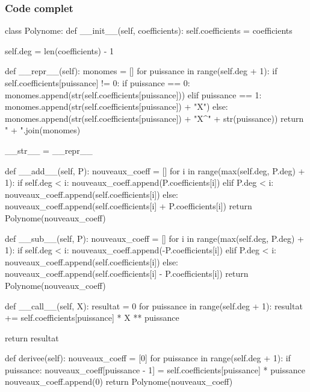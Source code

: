 		\subsubsection{Code complet}
		\begin{pythoncode}
			class Polynome:
				def __init__(self, coefficients):
					self.coefficients = coefficients

					self.deg = len(coefficients) - 1

				def __repr__(self):
					monomes = []
					for puissance in range(self.deg + 1):
						if self.coefficients[puissance] != 0:
						    if puissance == 0:
						        monomes.append(str(self.coefficients[puissance]))
						    elif puissance == 1:
						        monomes.append(str(self.coefficients[puissance]) + "X")
						    else:
						        monomes.append(str(self.coefficients[puissance]) + "X^" + str(puissance))
					return " + ".join(monomes)

				__str__ = __repr__

				def __add__(self, P):
					nouveaux_coeff = []
					for i in range(max(self.deg, P.deg) + 1):
						if self.deg < i:
						    nouveaux_coeff.append(P.coefficients[i])
						elif P.deg < i:
						    nouveaux_coeff.append(self.coefficients[i])
						else:
						    nouveaux_coeff.append(self.coefficients[i] + P.coefficients[i])
					return Polynome(nouveaux_coeff)

				def __sub__(self, P):
					nouveaux_coeff = []
					for i in range(max(self.deg, P.deg) + 1):
						if self.deg < i:
						    nouveaux_coeff.append(-P.coefficients[i])
						elif P.deg < i:
						    nouveaux_coeff.append(self.coefficients[i])
						else:
						    nouveaux_coeff.append(self.coefficients[i] - P.coefficients[i])
					return Polynome(nouveaux_coeff)

				def __call__(self, X):
					resultat = 0
					for puissance in range(self.deg + 1):
						resultat += self.coefficients[puissance] * X ** puissance

					return resultat

				def derivee(self):
					nouveaux_coeff = [0]
					for puissance in range(self.deg + 1):
						if puissance:
						    nouveaux_coeff[puissance - 1] = self.coefficients[puissance] * puissance
						    nouveaux_coeff.append(0)
					return Polynome(nouveaux_coeff)
		\end{pythoncode}
		
		
		
	